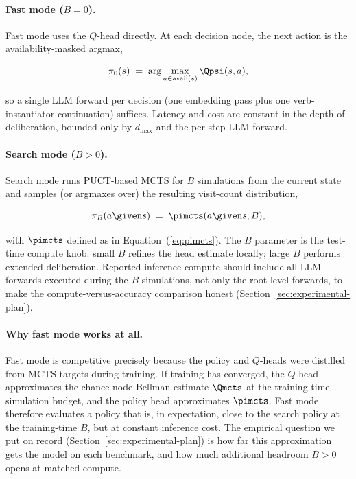 \paragraph{Fast mode ($B = 0$).}
Fast mode uses the $Q$-head directly. At each decision node, the next
action is the availability-masked argmax,

\begin{equation}
\label{eq:fastmode}
\pi_0(s) \;=\; \arg\max_{a \in \mathrm{avail}(s)} \Qpsi(s, a),
\end{equation}

so a single LLM forward per decision (one embedding pass plus one
verb-instantiator continuation) suffices. Latency and cost are
constant in the depth of deliberation, bounded only by $d_{\max}$ and
the per-step LLM forward.

\paragraph{Search mode ($B > 0$).}
Search mode runs PUCT-based MCTS for $B$ simulations from the current
state and samples (or argmaxes over) the resulting visit-count
distribution,

\begin{equation}
\label{eq:searchmode}
\pi_B(a \given s) \;=\; \pimcts(a \given s; B),
\end{equation}

with $\pimcts$ defined as in Equation~(\ref{eq:pimcts}). The $B$
parameter is the test-time compute knob: small $B$ refines the head
estimate locally; large $B$ performs extended deliberation. Reported
inference compute should include all LLM forwards executed during the
$B$ simulations, not only the root-level forwards, to make the
compute-versus-accuracy comparison honest
(Section~\ref{sec:experimental-plan}).

\paragraph{Why fast mode works at all.}
Fast mode is competitive precisely because the policy and $Q$-heads
were distilled from MCTS targets during training. If training has
converged, the $Q$-head approximates the chance-node Bellman estimate
$\Qmcts$ at the training-time simulation budget, and the policy head
approximates $\pimcts$. Fast mode therefore evaluates a policy that
is, in expectation, close to the search policy at the training-time
$B$, but at constant inference cost. The empirical question we put on
record (Section~\ref{sec:experimental-plan}) is how far this
approximation gets the model on each benchmark, and how much
additional headroom $B > 0$ opens at matched compute.

